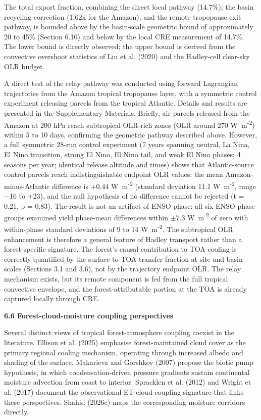 The total export fraction, combining the direct local pathway (14.7\%), the basin recycling correction (1.62x for the Amazon), and the remote tropopause exit pathway, is bounded above by the basin-scale geometric bound of approximately 20 to 45\% (Section 6.10) and below by the local CRE measurement of 14.7\%. The lower bound is directly observed; the upper bound is derived from the convective overshoot statistics of Liu et al. (2020) and the Hadley-cell clear-sky OLR budget.

A direct test of the relay pathway was conducted using forward Lagrangian trajectories from the Amazon tropical tropopause layer, with a symmetric control experiment releasing parcels from the tropical Atlantic. Details and results are presented in the Supplementary Materials. Briefly, air parcels released from the Amazon at 200 hPa reach subtropical OLR-rich zones (OLR around 270 W~m\textsuperscript{-2}) within 5 to 10 days, confirming the geometric pathway described above. However, a full symmetric 28-run control experiment (7 years spanning neutral, La Nina, El Nino transition, strong El Nino, El Nino tail, and weak El Nino phases; 4 seasons per year; identical release altitude and times) shows that Atlantic-source control parcels reach indistinguishable endpoint OLR values: the mean Amazon-minus-Atlantic difference is +0.44 W~m\textsuperscript{-2} (standard deviation 11.1 W~m\textsuperscript{-2}, range $-$16 to $+$23), and the null hypothesis of no difference cannot be rejected (t = 0.21, p = 0.83). The result is not an artifact of ENSO phase: all six ENSO phase groups examined yield phase-mean differences within $\pm$7.3 W~m\textsuperscript{-2} of zero with within-phase standard deviations of 9 to 14 W~m\textsuperscript{-2}. The subtropical OLR enhancement is therefore a general feature of Hadley transport rather than a forest-specific signature. The forest's causal contribution to TOA cooling is correctly quantified by the surface-to-TOA transfer fraction at site and basin scales (Sections 3.1 and 3.6), not by the trajectory endpoint OLR. The relay mechanism exists, but its remote component is fed from the full tropical convective envelope, and the forest-attributable portion at the TOA is already captured locally through CRE.

\textbf{6.6 Forest-cloud-moisture coupling perspectives}

Several distinct views of tropical forest-atmosphere coupling coexist in the literature. Ellison et al. (2025) emphasise forest-maintained cloud cover as the primary regional cooling mechanism, operating through increased albedo and shading of the surface. Makarieva and Gorshkov (2007) propose the biotic pump hypothesis, in which condensation-driven pressure gradients sustain continental moisture advection from coast to interior. Spracklen et al. (2012) and Wright et al. (2017) document the observational ET-cloud coupling signature that links these perspectives. Shahid (2026c) maps the corresponding moisture corridors directly.

